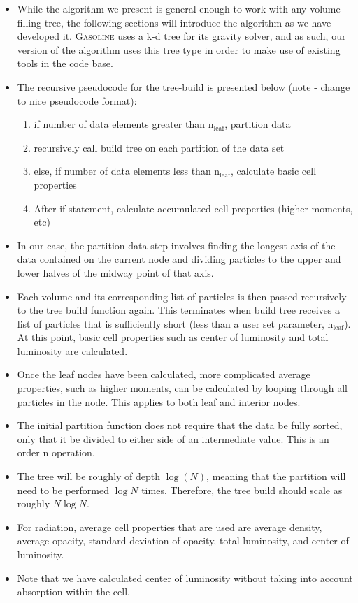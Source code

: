 \begin{itemize}
\item While the algorithm we present is general enough to work with any volume-filling tree, the following sections will introduce the algorithm as we have developed it. \textsc{Gasoline} uses a k-d tree for its gravity solver, and as such, our version of the algorithm uses this tree type in order to make use of existing tools in the code base.
\item The recursive pseudocode for the tree-build is presented below (note - change to nice pseudocode format):
	\begin{enumerate}
	\item if number of data elements greater than n$_{\mbox{leaf}}$, partition data
	\item recursively call build tree on each partition of the data set
	\item else, if number of data elements less than n$_{\mbox{leaf}}$, calculate basic cell properties
	\item After if statement, calculate accumulated cell properties (higher moments, etc)
	\end{enumerate}
\item In our case, the partition data step involves finding the longest axis of the data contained on the current node and dividing particles to the upper and lower halves of the midway point of that axis.
\item Each volume and its corresponding list of particles is then passed recursively to the tree build function again. This terminates when build tree receives a list of particles that is sufficiently short (less than a user set parameter, n$_{\mbox{leaf}}$). At this point, basic cell properties such as center of luminosity and total luminosity are calculated.
\item Once the leaf nodes have been calculated, more complicated average properties, such as higher moments, can be calculated by looping through all particles in the node. This applies to both leaf and interior nodes.
\item The initial partition function does not require that the data be fully sorted, only that it be divided to either side of an intermediate value. This is an order n operation.
\item The tree will be roughly of depth $\log(N)$, meaning that the partition will need to be performed $\log{N}$ times. Therefore, the tree build should scale as roughly $N\log{N}$.
\item For radiation, average cell properties that are used are average density, average opacity, standard deviation of opacity, total luminosity, and center of luminosity.
\item Note that we have calculated center of luminosity without taking into account absorption within the cell.
\end{itemize}

